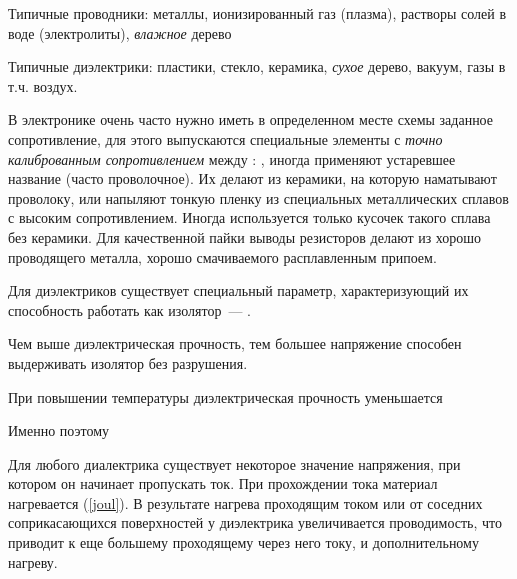 Типичные проводники: металлы, ионизированный газ (плазма), растворы солей в воде
(электролиты), \emph{влажное} дерево

Типичные диэлектрики: пластики, стекло, керамика, \emph{сухое} дерево, вакуум,
газы в т.ч. воздух.

\bigskip
В электронике очень часто нужно иметь в определенном месте схемы заданное
сопротивление, для этого выпускаются специальные элементы с \emph{точно
калиброванным сопротивлением} между :
, иногда применяют устаревшее название 
(часто проволочное). Их делают из керамики, на которую наматывают проволоку, или
напыляют тонкую пленку из специальных металлических сплавов с высоким
сопротивлением.
Иногда используется только кусочек такого сплава без керамики.
Для качественной пайки выводы резисторов делают из хорошо проводящего металла,
хорошо смачиваемого расплавленным припоем.


\bigskip
Для диэлектриков существует специальный параметр, характеризующий их способность
работать как изолятор\ --- .

\begin{framed}\noindent
Чем выше диэлектрическая прочность, тем большее напряжение способен выдерживать
изолятор без разрушения.
\end{framed}

\begin{framed}\noindent
При повышении температуры диэлектрическая прочность уменьшается 
\end{framed}

Именно поэтому

\begin{framed}\noindent
{}
\end{framed}

\begin{framed}\noindent
{}
\end{framed}

Для любого диалектрика существует некоторое значение напряжения, при котором он
начинает пропускать ток. При прохождении тока материал нагревается (\ref{joul}).
В результате нагрева проходящим током или от соседних соприкасающихся
поверхностей у диэлектрика увеличивается проводимость, что приводит к еще
большему проходящему через него току, и дополнительному нагреву. 

